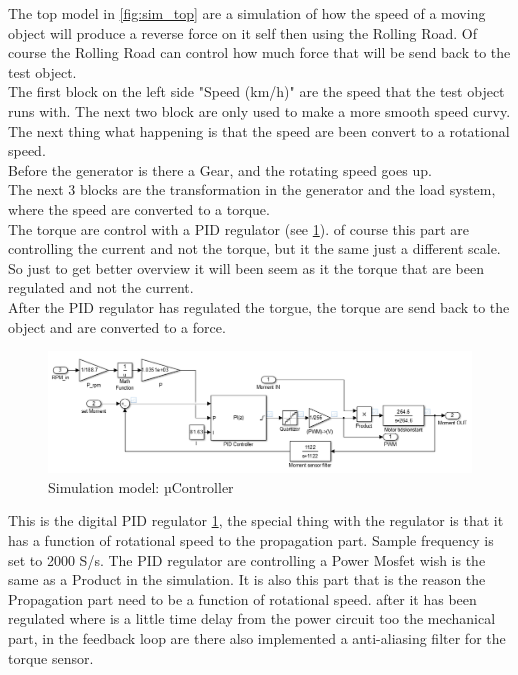 The top model in \ref{fig:sim_top} are a simulation of how the speed of a moving object will produce a reverse force on it self then using the Rolling Road. Of course the Rolling Road can control how much force that will be send back to the test object.\\
The first block on the left side "Speed (km/h)" are the speed that the test object runs with. The next two block are only used to make a more smooth speed curvy.\\
The next thing what happening is that the speed are been convert to a rotational speed.\\
Before the generator is there a Gear, and the rotating speed goes up.\\
The next 3 blocks are the transformation in the generator and the load system, where the speed are converted to a torque.\\
The torque are control with a PID regulator (see \ref{fig:sim_PSOC}). of course this part are controlling the current and not the torque, but it the same just a different scale. So just to get better overview it will been seem as it the torque that are been regulated and not the current.\\ 
After the PID regulator has regulated the torgue, the torque are send back to the object and are converted to a force.   

\begin{figure}[H]
	\centering
	\includegraphics [width=6in]{Hardware/Pictures/simulation_uController.PNG}
	\caption{Simulation model: µController}
	\label{fig:sim_PSOC}
\end{figure}  

This is the digital PID regulator \ref{fig:sim_PSOC}, the special thing with the regulator is that it has a function of rotational speed to the propagation part. Sample frequency is set to 2000 S/s. The PID regulator are controlling a Power Mosfet wish is the same as a Product in the simulation. It is also this part that is the reason the Propagation part need to be a function of rotational speed. after it has been regulated where is a little time delay from the power circuit too the mechanical part, in the feedback loop are there also implemented a anti-aliasing filter for the torque sensor.  
  